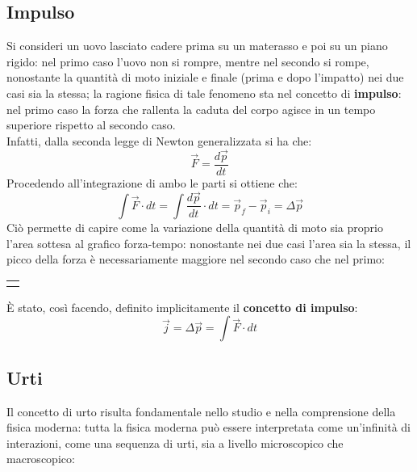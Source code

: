 \documentclass[a4paper]{extarticle}
\begin{document}
\subsection{Impulso}
Si consideri un uovo lasciato cadere prima su un materasso e poi su un piano rigido: nel primo caso l'uovo non si rompre, mentre nel secondo si rompe, nonostante la quantità di moto iniziale e finale (prima e dopo l'impatto) nei due casi sia la stessa; la ragione fisica di tale fenomeno sta nel concetto di \textbf{impulso}: nel primo caso la forza che rallenta la caduta del corpo agisce in un tempo superiore rispetto al secondo caso.\\
Infatti, dalla seconda legge di Newton generalizzata si ha che:
\[\vec F = \frac{d \vec p}{dt}\]
Procedendo all'integrazione di ambo le parti si ottiene che:
\[\int \vec F \cdot dt = \int \frac{d \vec p}{dt} \cdot dt = \vec p_f - \vec p_i = \Delta \vec p\]
Ciò permette di capire come la variazione della quantità di moto sia proprio l'area sottesa al grafico forza-tempo: nonostante nei due casi l'area sia la stessa, il picco della forza è necessariamente maggiore nel secondo caso che nel primo:

\vspace{2em}
\noindent
{}
\begin{tabularx}{\textwidth}{P}
  {
      \centering
    }
\end{tabularx}

\vspace{1em}
\noindent
È stato, così facendo, definito implicitamente il \textbf{concetto di impulso}:
\[\boxed{\vec j = \Delta \vec p = \int \vec F \cdot dt}\]

\vspace{1em}
\subsection{Urti}
Il concetto di urto risulta fondamentale nello studio e nella comprensione della fisica moderna: tutta la fisica moderna può essere interpretata come un'infinità di interazioni, come una sequenza di urti, sia a livello microscopico che macroscopico:
\end{document}
